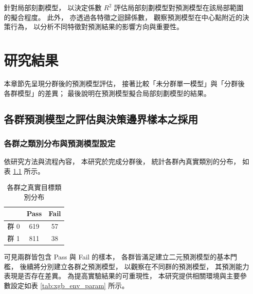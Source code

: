 \documentclass[12pt,a4paper,oneside]{book}
\begin{document}
	針對局部刻劃模型，
	以決定係數 $R^2$ 評估局部刻劃模型對預測模型在該局部範圍的擬合程度。
	此外，
	亦透過各特徵之迴歸係數，
	觀察預測模型在中心點附近的決策行為，
	以分析不同特徵對預測結果的影響方向與重要性。

	\chapter{研究結果}
	本章節先呈現分群後的預測模型評估，
	接著比較「未分群單一模型」與「分群後各群模型」的差異；
	最後說明在預測模型擬合局部刻劃模型的結果。

	\section{各群預測模型之評估與決策邊界樣本之採用}
	
	\subsection{各群之類別分布與預測模型設定}

	依研究方法與流程內容，
	本研究於完成分群後，
	統計各群內真實類別的分布，
	如表 \ref{tab:分群} 所示。

	\begin{table}[H]
		\centering
		\caption{各群之真實目標類別分布}
		\vspace{0.15cm}
		\label{tab:分群}
		\begin{tabular}{|c|c|c|}
		\hline
		& Pass & Fail \\
		\hline
		群 0 & 619 & 57 \\
		\hline
		群 1 & 811 & 38 \\
		\hline
		\end{tabular}
	\end{table}

	可見兩群皆包含 Pass 與 Fail 的樣本，
	各群皆滿足建立二元預測模型的基本門檻，
	後續將分別建立各群之預測模型，
	以觀察在不同群的預測模型，
	其預測能力表現是否存在差異。
	為提高實驗結果的可重現性，
	本研究提供相關環境與主要參數設定如表 \ref{tab:xgb_env_param} 所示。
\end{document}
